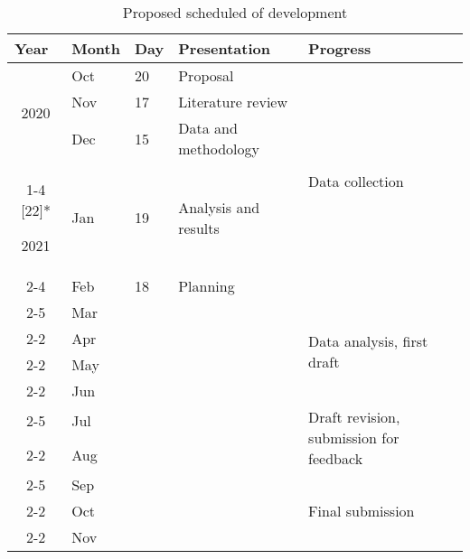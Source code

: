 \begin{table}[H]
  \centering
    \begin{tabular}{|c|l|ll|l|}
    \toprule
    \multicolumn{1}{|l|}{Year} & Month & \multicolumn{1}{l|}{Day} & Presentation & Progress \\
    \midrule
    \multirow{3}[6]{*}{\begin{sideways}2020\end{sideways}} & Oct   & \multicolumn{1}{l|}{20} & Proposal & \multirow{5}[10]{*}{Data collection} \\
\cmidrule{2-4}          & Nov   & \multicolumn{1}{l|}{17} & Literature review &  \\
\cmidrule{2-4}          & Dec   & \multicolumn{1}{l|}{15} & Data and methodology &  \\
\cmidrule{1-4}    \multirow{11}[22]{*}{\begin{sideways}2021\end{sideways}} & Jan   & \multicolumn{1}{l|}{19} & Analysis and results &  \\
\cmidrule{2-4}          & Feb   & \multicolumn{1}{l|}{18} & Planning &  \\
\cmidrule{2-5}          & Mar   & \multicolumn{2}{l|}{\multirow{4}[8]{*}{}} & \multirow{4}[8]{*}{Data analysis, first draft} \\
\cmidrule{2-2}          & Apr   & \multicolumn{2}{l|}{} &  \\
\cmidrule{2-2}          & May   & \multicolumn{2}{l|}{} &  \\
\cmidrule{2-2}          & Jun   & \multicolumn{2}{l|}{} &  \\
\cmidrule{2-5}          & Jul   & \multicolumn{2}{l|}{\multirow{2}[4]{*}{}} & \multirow{2}[4]{*}{Draft revision, submission for feedback} \\
\cmidrule{2-2}          & Aug   & \multicolumn{2}{l|}{} &  \\
\cmidrule{2-5}          & Sep   & \multicolumn{2}{l|}{\multirow{3}[6]{*}{}} & \multirow{3}[6]{*}{Final submission} \\
\cmidrule{2-2}          & Oct   & \multicolumn{2}{l|}{} &  \\
\cmidrule{2-2}          & Nov   & \multicolumn{2}{l|}{} &  \\
    \bottomrule
    \end{tabular}%
  \caption{Proposed scheduled of development}
  \label{tab:schedule}%
\end{table}%